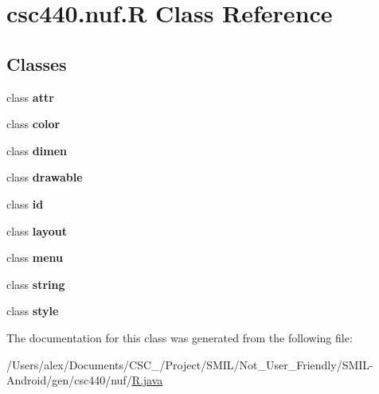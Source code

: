 \hypertarget{classcsc440_1_1nuf_1_1_r}{\section{csc440.\-nuf.\-R Class Reference}
\label{classcsc440_1_1nuf_1_1_r}
}
\subsection*{Classes}
\begin{DoxyCompactItemize}
\item 
class {\bfseries attr}
\item 
class {\bfseries color}
\item 
class {\bfseries dimen}
\item 
class {\bfseries drawable}
\item 
class {\bfseries id}
\item 
class {\bfseries layout}
\item 
class {\bfseries menu}
\item 
class {\bfseries string}
\item 
class {\bfseries style}
\end{DoxyCompactItemize}


The documentation for this class was generated from the following file\-:\begin{DoxyCompactItemize}
\item 
/\-Users/alex/\-Documents/\-C\-S\-C\-\_/\-Project/\-S\-M\-I\-L/\-Not\-\_\-\-User\-\_\-\-Friendly/\-S\-M\-I\-L-\/\-Android/gen/csc440/nuf/\hyperlink{_r_8java}{R.\-java}\end{DoxyCompactItemize}
